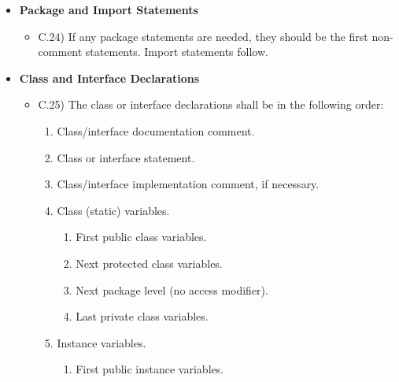 \documentclass[../../codeInspection.tex]{subfiles}
\begin{document}
\begin{itemize}
\begin{itemize}
						\end{itemize}

				\item 	\textbf{Package and Import Statements}
						\begin{itemize}

							\item C.24) If any package statements are needed, they should be the first non- comment statements. Import statements follow.

						\end{itemize}

				\item 	\textbf{Class and Interface Declarations}
						\begin{itemize}

							\item C.25) The class or interface declarations shall be in the following order:
								\begin{enumerate}

									\item Class/interface documentation comment.

									\item Class or interface statement.

									\item Class/interface implementation comment, if necessary.

									\item Class (static) variables.

										\begin{enumerate}

											\item First public class variables.

											\item Next protected class variables.

											\item Next package level (no access modifier).

											\item Last private class variables.

										\end{enumerate}

									\item Instance variables.

										\begin{enumerate}

											\item First public instance variables.


\end{enumerate}
\end{enumerate}
\end{itemize}
\end{itemize}
\end{document}
